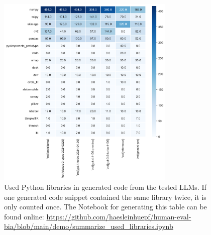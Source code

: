 \documentclass{ecai}
\begin{document}
\begin{figure}[h]
    \includegraphics[width=8.5cm]{used_libraries_heatmap.png}
    \caption{Used Python libraries in generated code from the tested LLMs. If one generated code snippet contained the same library twice, it is only counted once. The Notebook for generating this table can be found online: \url{https://github.com/haesleinhuepf/human-eval-bia/blob/main/demo/summarize_used_libraries.ipynb}
    \newline }
    \label{fig:usedlibraries}
    \end{figure}

%
\end{document}
